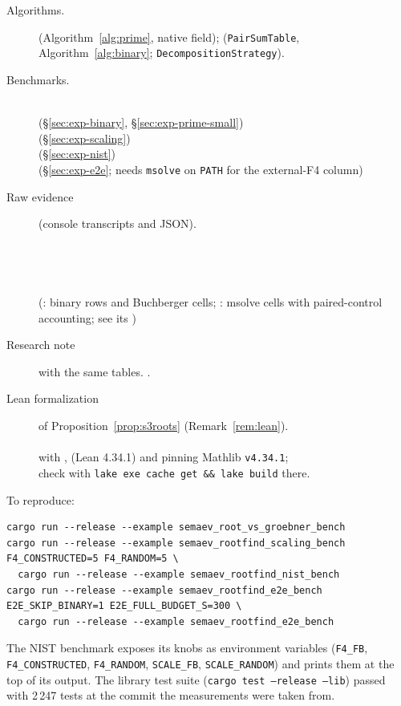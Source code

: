 \documentclass[10pt,a4paper]{article}
\theoremstyle{remark}
\newcommand{\code}[1]{\texttt{#1}}
\begin{document}
\begin{description}
\item[Algorithms.]
  (Algorithm~\ref{alg:prime}, native field);
  (\code{PairSumTable}, Algorithm~\ref{alg:binary};
  \code{DecompositionStrategy}).
\item[Benchmarks.] \hfill\\
  (\S\ref{sec:exp-binary}, \S\ref{sec:exp-prime-small}) \\
  (\S\ref{sec:exp-scaling}) \\
  (\S\ref{sec:exp-nist}) \\
  (\S\ref{sec:exp-e2e}; needs \code{msolve} on \code{PATH} for the
  external-F4 column)
\item[Raw evidence] (console transcripts and JSON). \hfill\\
   \\
   \\
   \\
   \\
  \quad(: binary rows and Buchberger cells; :
  msolve cells with paired-control accounting; see its )
\item[Research note] with the same tables.
  .
\item[Lean formalization] of Proposition~\ref{prop:s3roots}
  (Remark~\ref{rem:lean}). \hfill\\
   \\
  with ,  (Lean 4.34.1) and
   pinning Mathlib \code{v4.34.1}; \\
  check with \code{lake exe cache get \&\& lake build} there.
\end{description}

\noindent To reproduce:
\begin{verbatim}
cargo run --release --example semaev_root_vs_groebner_bench
cargo run --release --example semaev_rootfind_scaling_bench
F4_CONSTRUCTED=5 F4_RANDOM=5 \
  cargo run --release --example semaev_rootfind_nist_bench
cargo run --release --example semaev_rootfind_e2e_bench
E2E_SKIP_BINARY=1 E2E_FULL_BUDGET_S=300 \
  cargo run --release --example semaev_rootfind_e2e_bench
\end{verbatim}
The NIST benchmark exposes its knobs as environment variables
(\code{F4\_FB}, \code{F4\_CONSTRUCTED}, \code{F4\_RANDOM},
\code{SCALE\_FB}, \code{SCALE\_RANDOM}) and prints them at the top of
its output. The library test suite (\code{cargo test --release --lib})
passed with 2\,247 tests at the commit the measurements were taken from.
\end{document}
